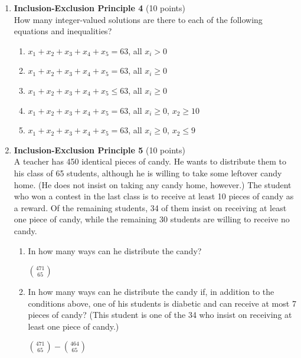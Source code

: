 \begin{enumerate}
  \item \textbf{Inclusion-Exclusion Principle 4} (10 points)\\
  How many integer-valued solutions are there to each of the following equations and inequalities?
  \begin{enumerate}[label=\alph*.]
    \item $x_1+x_2+x_3+x_4+x_5=63$, all $x_i>0$
    \begin{subanswer}
    \end{subanswer}
    \item $x_1+x_2+x_3+x_4+x_5=63$, all $x_i \geq 0$
    \begin{subanswer}
    \end{subanswer}
    \item $x_1+x_2+x_3+x_4+x_5 \leq 63$, all $x_i \geq 0$
    \begin{subanswer}
    \end{subanswer}
    \item $x_1+x_2+x_3+x_4+x_5=63$, all $x_i \geq 0$, $x_2 \geq 10$
    \begin{subanswer}
    \end{subanswer}
    \item $x_1+x_2+x_3+x_4+x_5=63$, all $x_i \geq 0$, $x_2 \leq 9$
    \begin{subanswer}
    \end{subanswer}
  \end{enumerate}



  \item \textbf{Inclusion-Exclusion Principle 5} (10 points)\\
  A teacher has 450 identical pieces of candy. He wants to distribute them to his class of 65 students, although he is willing to take some leftover candy home. (He does not insist on taking any candy home, however.) The student who won a contest in the last class is to receive at least 10 pieces of candy as a reward. Of the remaining students, 34 of them insist on receiving at least one piece of candy, while the remaining 30 students are willing to receive no candy.
  \begin{enumerate}[label=\alph*.]
    \item In how many ways can he distribute the candy?
    \begin{subanswer}
      $\binom{471}{65}$
    \end{subanswer}
    \item In how many ways can he distribute the candy if, in addition to the conditions 
    above, one of his students is diabetic and can receive at most 7 pieces of candy? 
    (This student is one of the 34 who insist on receiving at least one piece of candy.)
    \begin{subanswer}
      $\binom{471}{65}-\binom{464}{65}$
    \end{subanswer}
  \end{enumerate}



\end{enumerate}
